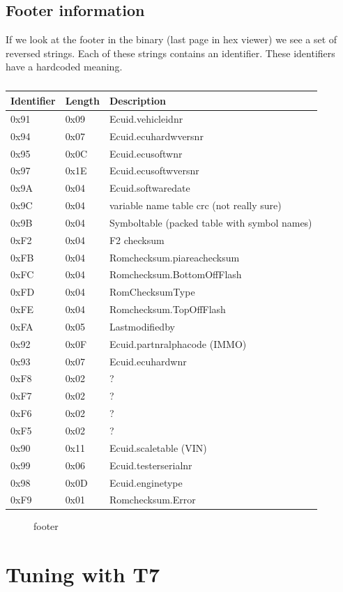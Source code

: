 \documentclass[11pt,a4paper]{book}
\newcommand{\Mfig}[1]{%
\begin{figure}[<+htpb+>]
    \centering
    \missingfigure{}
    \caption{#1}
\end{figure}}
\begin{document}
\section{Footer information}
If we look at the footer in the binary (last page in hex viewer) we see a set of reversed strings. Each
of these strings contains an identifier. These identifiers have a hardcoded meaning.

\begin{table}
    \centering
    \begin{tabular}{lll}
Identifier & Length & Description \\
\midrule
0x91& 0x09& Ecuid.vehicleidnr \\
0x94 & 0x07 & Ecuid.ecuhardwversnr \\
0x95 & 0x0C & Ecuid.ecusoftwnr \\
0x97 & 0x1E & Ecuid.ecusoftwversnr \\
0x9A & 0x04 & Ecuid.softwaredate \\
0x9C & 0x04 & variable name table crc (not really sure) \\
0x9B & 0x04 & Symboltable (packed table with symbol names) \\
0xF2 & 0x04 & F2 checksum \\
0xFB & 0x04 & Romchecksum.piareachecksum \\
0xFC & 0x04 & Romchecksum.BottomOffFlash \\
0xFD & 0x04 & RomChecksumType \\
0xFE & 0x04 & Romchecksum.TopOffFlash \\
0xFA & 0x05 & Lastmodifiedby \\
0x92 & 0x0F & Ecuid.partnralphacode (IMMO) \\
0x93 & 0x07 & Ecuid.ecuhardwnr \\
0xF8 & 0x02 & ? \\
0xF7 & 0x02 & ? \\
0xF6 & 0x02 & ? \\
0xF5 & 0x02 & ? \\
0x90 & 0x11 & Ecuid.scaletable (VIN) \\
0x99 & 0x06 & Ecuid.testerserialnr \\
0x98 & 0x0D & Ecuid.enginetype \\
0xF9 & 0x01 & Romchecksum.Error
\end{tabular}
    \caption{}
    \label{tab:}
\end{table}
\Mfig{footer}

\chapter{Tuning with T7}
\end{document}
